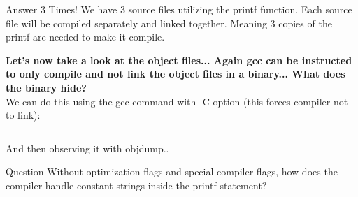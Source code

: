 \documentclass{beamer}
\begin{document}
\begin{frame}[fragile]
\begin{block}{Answer}
    3 Times! We have 3 source files utilizing the printf function. Each source file will be compiled separately and linked together. Meaning 3 copies of the printf are needed to make it compile.
\end{block}
\textbf{Let's now take a look at the object files... Again gcc can be instructed to only compile and not link the object files in a binary... What does the binary hide?}\\
We can do this using the gcc command with -C option (this forces compiler not to link):
\begin{lstlisting}[language=bash]
% gcc src/main.c lib/i2c.c lib/spi.c lib/uart.c -c
\end{lstlisting}
And then observing it with objdump..
\begin{block}{Question}
Without optimization flags and special compiler flags, how does the compiler handle constant strings inside the printf statement?
\end{block}
\end{frame}
\end{document}
